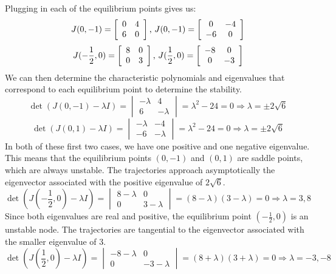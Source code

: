 \documentclass[12pt,letterpaper,reqno]{amsart}
\begin{document}
\begin{enumerate}
\begin{enumerate}
\begin{flushleft}
    \renewcommand\arraystretch{1}
    Plugging in each of the equilibrium points gives us:
    $$J(0,-1) = \left[ \begin{array} { c c } { 0 } & { 4 } \\ { 6 } & { 0 } \end{array} \right] \text{, } J(0,-1) = \left[ \begin{array} { c c } { 0 } & { -4 } \\ { -6 } & { 0 } \end{array} \right]$$
    $$J(-\frac{1}{2},0) = \left[ \begin{array} { c c } { 8 } & { 0 } \\ { 0 } & { 3 } \end{array} \right] \text{, } J(\frac{1}{2},0) = \left[ \begin{array} { c c } { -8 } & { 0 } \\ { 0 } & { -3 } \end{array} \right]$$
    We can then determine the characteristic polynomials and eigenvalues that correspond to each equilibrium point to determine the stability.
    $$\det(J(0,-1) - \lambda I) = \begin{vmatrix} { -\lambda } & { 4 } \\ { 6 } & { -\lambda } \end{vmatrix} = \lambda^2 - 24 = 0 \Rightarrow \lambda = \pm 2\sqrt{6}$$
    $$\det(J(0,1) - \lambda I) = \begin{vmatrix} { -\lambda } & { -4 } \\ { -6 } & { -\lambda } \end{vmatrix} = \lambda^2 - 24 = 0 \Rightarrow \lambda = \pm 2\sqrt{6}$$
    In both of these first two cases, we have one positive and one negative eigenvalue. This means that the equilibrium points $(0,-1)$ and $(0,1)$ are saddle points, which are always unstable. The trajectories approach asymptotically the eigenvector associated with the positive eigenvalue of $2\sqrt{6}$.
    \newpage
    $$\det(J(-\frac{1}{2},0) - \lambda I) = \begin{vmatrix} { 8-\lambda } & { 0 } \\ { 0 } & { 3-\lambda } \end{vmatrix} = (8-\lambda)(3-\lambda) = 0 \Rightarrow \lambda = 3, 8$$
    Since both eigenvalues are real and positive, the equilibrium point $(-\frac{1}{2}, 0)$ is an unstable node. The trajectories are tangential to the eigenvector associated with the smaller eigenvalue of 3.
    $$\det(J(\frac{1}{2},0) - \lambda I) = \begin{vmatrix} { -8-\lambda } & { 0 } \\ { 0 } & { -3-\lambda } \end{vmatrix} = (8+\lambda)(3+\lambda) = 0 \Rightarrow \lambda = -3, -8$$

\end{flushleft}
\end{enumerate}
\end{enumerate}
\end{document}
